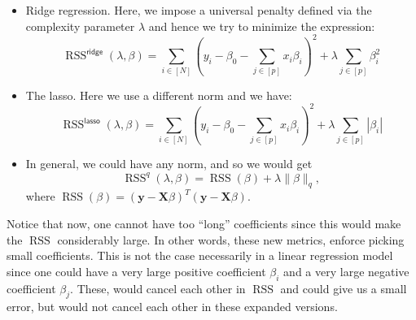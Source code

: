 \documentclass[11pt]{article}
\theoremstyle{definition}
\newcommand{\XX}{\mathbf{X}}
\newcommand{\yy}{\mathbf{y}}
\newcommand{\ridge}{\textsf{ridge}}
\newcommand{\lasso}{\textsf{lasso}}
\DeclareMathOperator*{\RSS}{RSS} \DeclareMathOperator*{\WRSS}{WRSS}
\begin{document}
\begin{itemize}
	\item Ridge regression. Here, we impose a universal penalty defined via
	the complexity parameter $\lambda$ and hence we try to minimize the expression:
	\[\RSS^\ridge(\lambda,\beta)=\sum_{i\in[N]}\left(y_i-\beta_0-\sum_{j\in[p]}x_i\beta_i\right)^2
	+ \lambda\sum_{j\in[p]}\beta_i^2\]

	\item The lasso. Here we use a different norm and we have:
	\[\RSS^\lasso(\lambda,\beta)=\sum_{i\in[N]}\left(y_i-\beta_0-\sum_{j\in[p]}x_i\beta_i\right)^2
	+ \lambda\sum_{j\in[p]}|\beta_i|\]

	\item In general, we could have any norm, and so we would get
	\[\RSS^q(\lambda,\beta)=\RSS(\beta) + \lambda \|\beta\|_q,\] where
	$\RSS(\beta)=(\yy-\XX\beta)^T(\yy-\XX\beta)$.
\end{itemize}
Notice that now, one cannot have too ``long'' coefficients since this would make
the $\RSS$ considerably large. In other words, these new metrics, enforce
picking small coefficients. This is not the case necessarily in a linear
regression model since one could have a very large positive coefficient
$\beta_i$ and a very large negative coefficient $\beta_j$. These, would cancel
each other in $\RSS$ and could give us a small error, but would not cancel each
other in these expanded versions.
\end{document}
